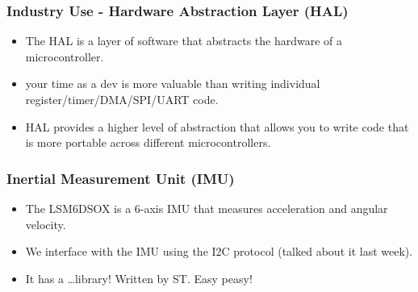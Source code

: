 \documentclass{beamer}
\begin{document}
\begin{frame}
    \frametitle{Industry Use - Hardware Abstraction Layer (HAL)}
    \begin{itemize}
      \item The HAL is a layer of software that abstracts the hardware of a microcontroller.
      \item your time as a dev is more valuable than writing individual register/timer/DMA/SPI/UART code.
      \item HAL provides a higher level of abstraction that allows you to write code that is more portable across different microcontrollers.
    \end{itemize}
\end{frame}

\begin{frame}
    \frametitle{Inertial Measurement Unit (IMU)}
    \begin{itemize}
      \item The LSM6DSOX is a 6-axis IMU that measures acceleration and angular velocity.
      \item We interface with the IMU using the I2C protocol (talked about it last week).
      \item It has a \dots library! Written by ST. Easy peasy!
    \end{itemize}
\end{frame}
\end{document}
